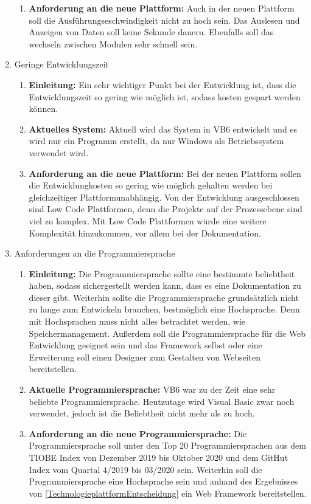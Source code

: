 \documentclass[ngerman]{article}
\begin{document}
\begin{enumerate}
\begin{enumerate}[label=]
            \item \textbf{Anforderung an die neue Plattform:} Auch in der neuen Plattform soll die Ausführungseschwindigkeit nicht zu hoch sein. Das Auslesen und Anzeigen von Daten soll keine Sekunde dauern. Ebenfalls soll das wechseln zwischen Modulen sehr schnell sein.\\
        \end{enumerate}
        \item Geringe Entwicklungszeit
        \begin{enumerate}[label=]
            \item \textbf{Einleitung:} Ein sehr wichtiger Punkt bei der Entwicklung ist, dass die Entwicklungszeit so gering wie möglich ist, sodass kosten gespart werden können.
            \item \textbf{Aktuelles System:} Aktuell wird das System in VB6 entwickelt und es wird nur ein Programm erstellt, da nur Windows als Betriebssystem verwendet wird.
            \item \textbf{Anforderung an die neue Plattform:} Bei der neuen Plattform sollen die Entwicklungkosten so gering wie möglich gehalten werden bei gleichzeitiger Plattformunabhängig. Von der Entwicklung ausgeschlossen sind Low Code Plattformen, denn die Projekte auf der Prozessebene sind viel zu komplex. Mit Low Code Plattformen würde eine weitere Komplexität hinzukommen, vor allem bei der Dokumentation.
        \end{enumerate}
        \item Anforderungen an die Programmiersprache
        \begin{enumerate}[label=]
            \item \textbf{Einleitung:} Die Programmiersprache sollte eine bestimmte beliebtheit haben, sodass sichergestellt werden kann, dass es eine Dokumentation zu dieser gibt. Weiterhin sollte die Programmiersprache grundsätzlich nicht zu lange zum Entwickeln brauchen, bestmöglich eine Hochsprache. Denn mit Hochsprachen muss nicht alles betrachtet werden, wie Speichermanagement. Außerdem soll die Programmiersprache für die Web Entwicklung geeignet sein und das Framework selbst oder eine Erweiterung soll einen Designer zum Gestalten von Webseiten bereitstellen.
            \item \textbf{Aktuelle Programmiersprache:} VB6 war zu der Zeit eine sehr beliebte Programmiersprache. Heutzutage wird Visual Basic zwar noch verwendet, jedoch ist die Beliebtheit nicht mehr als zu hoch.
            \item \textbf{Anforderung an die neue Programmiersprache:} Die Programmiersprache soll unter den Top 20 Programmiersprachen aus dem TIOBE Index von Dezember 2019 bis Oktober 2020 und dem GitHut Index vom Quartal 4/2019 bis 03/2020 sein. Weiterhin soll die Programmiersprache eine Hochsprache sein und anhand des Ergebnisses von \ref{TechnologieplattformEntscheidung} ein Web Framework bereitstellen.
        \end{enumerate}
    \end{enumerate}
\end{document}
